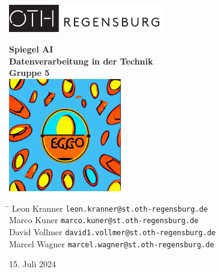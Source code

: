 \documentclass[a4paper,12pt]{report}
\begin{document}
\begin{titlepage}
    \begin{flushleft}
        \includegraphics[height=1.2cm]{pictures/oth_logo.eps}
    \end{flushleft}
    \vspace{2cm}
    \begin{center}
        {\Huge\textbf{Spiegel AI}}\\[1cm]
        {\Large\textbf{Datenverarbeitung in der Technik}}\\[0.5cm]
        {\Large\textbf{Gruppe 5}}\\[1.5cm]
        \includegraphics[width=0.37\textwidth]{pictures/eggo_icon.jpeg}\\[1cm]
    \end{center}
    \vspace{2cm}
    \begin{flushleft}
        \begin{tabbing}
            \hspace{8cm} \= \hspace{4cm} \kill
            Leon Kranner \> \texttt{leon.kranner@st.oth-regensburg.de} \\
            Marco Kuner \> \texttt{marco.kuner@st.oth-regensburg.de} \\
            David Vollmer \> \texttt{david1.vollmer@st.oth-regensburg.de} \\
            Marcel Wagner \> \texttt{marcel.wagner@st.oth-regensburg.de} \\
        \end{tabbing}
    \end{flushleft}
    \vfill
    \begin{center}
        {\Large 15. Juli 2024}
    \end{center}
\end{titlepage}
\end{document}

